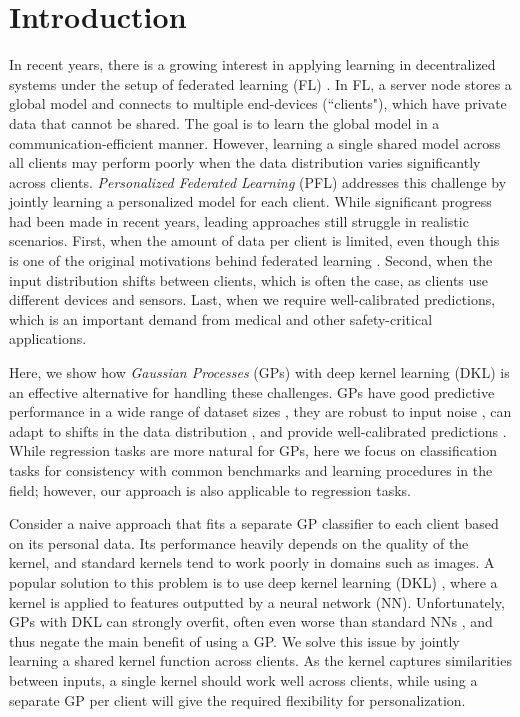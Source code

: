 \documentclass{article}
\begin{document}
\section{Introduction}
In recent years, there is a growing interest in applying learning in decentralized systems under the setup of federated learning (FL) \cite{konevcny2016federated, mcmahan2017communication, shokri2015privacy}. In FL, a server node stores a global model and connects to multiple end-devices (``clients"), which have private data that cannot be shared. The goal is to learn the global model in a communication-efficient manner.  However, learning a single shared model across all clients may perform poorly when the data distribution varies significantly across clients. \textit{Personalized Federated Learning} (PFL) \cite{smith2017federated} addresses this challenge by jointly learning a personalized model for each client. While significant progress had been made in recent years, leading approaches still struggle in realistic scenarios. First, when the amount of data per client is limited, even though this is one of the original motivations behind federated learning \cite{arivazhagan2019federated, mcmahan2017communication, t2020personalized}. Second, when the input distribution shifts between clients, which is often the case, as clients use different devices and sensors. Last, when we require well-calibrated predictions, which is an important demand from medical and other safety-critical applications.  

Here, we show how \textit{Gaussian Processes} (GPs) with deep kernel learning (DKL) \cite{gordon16_DKL} is an effective alternative for handling these challenges. GPs have good predictive performance in a wide range of dataset sizes \cite{achituve2021gp_icml, wilson2016stochastic}, they are robust to input noise \cite{villacampa2021multi}, can adapt to shifts in the data distribution \cite{maddox2021fast}, and provide well-calibrated predictions \cite{snell2020bayesian}. While regression tasks are more natural for GPs, here we focus on classification tasks for consistency with common benchmarks and learning procedures in the field; however, our approach is also applicable to regression tasks.

Consider a naive approach that fits a separate GP classifier to each client based on its personal data. Its performance heavily depends on the quality of the kernel, and standard kernels tend to work poorly in domains such as images. A popular solution to this problem is to use deep kernel learning (DKL) \cite{gordon16_DKL}, where a kernel is applied to features outputted by a neural network (NN). Unfortunately, GPs with DKL can strongly overfit, often even worse than standard NNs \cite{OberRW2021}, and thus negate the main benefit of using a GP. We solve this issue by jointly learning a shared kernel function across clients. As the kernel captures similarities between inputs, a single kernel should work well across clients, while using a separate GP per client will give the required flexibility for personalization.
\end{document}
